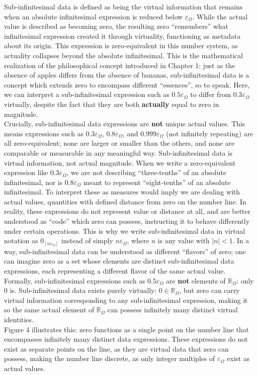\documentclass{article}
\begin{document}
Sub-infinitesimal data is defined as being the virtual information that remains when an absolute infinitesimal expression is reduced below $\varepsilon_\Omega$. While the actual value is described as becoming zero, the resulting zero ``remembers'' what infinitesimal expression created it through virtuality, functioning as metadata about its origin. This expression is zero-equivalent in this number system, as actuality collapses beyond the absolute infinitesimal. This is the mathematical realization of the philosophical concept introduced in Chapter 1: just as the absence of apples differs from the absence of bananas, sub-infinitesimal data is a concept which extends zero to encompass different ``essences'', so to speak. Here, we can interpret a sub-infinitesimal expression such as $0.5\varepsilon_\Omega$ to differ from $0.3\varepsilon_\Omega$ virtually, despite the fact that they are both \textbf{actually} equal to zero in magnitude.
\\Crucially, sub-infinitesimal data expressions are \textbf{not} unique actual values. This means expressions such as $0.3\varepsilon_\Omega$, $0.8\varepsilon_\Omega$, and $0.999\varepsilon_\Omega$ (not infinitely repeating) are all zero-equivalent; none are larger or smaller than the others, and none are comparable or measurable in any meaningful way. Sub-infinitesimal data is virtual information, not actual magnitude. When we write a zero-equivalent expression like $0.3\varepsilon_\Omega$, we are not describing ``three-tenths'' of an absolute infinitesimal, nor is $0.8\varepsilon_\Omega$ meant to represent ``eight-tenths'' of an absolute infinitesimal. To interpret these as measures would imply we are dealing with actual values, quantities with defined distance from zero on the number line. In reality, these expressions do not represent value or distance at all, and are better understood as ``code'' which zero can possess, instructing it to behave differently under certain operations.  This is why we write sub-infinitesimal data in virtual notation as $0_{[n\varepsilon_\Omega]}$ instead of simply $n\varepsilon_\Omega$, where $n$ is any value with $|n| < 1$. 
In a way, sub-infinitesimal data can be understood as different ``flavors'' of zero; one can imagine zero as a set whose elements are distinct sub-infinitesimal data expressions, each representing a different flavor of the same actual value. Formally, sub-infinitesimal expressions such as $0.5\varepsilon_\Omega$ are \textbf{not} elements of $\mathbb{R}_\Omega$: only $0$ is. Sub-infinitesimal data exists purely virtually: $0 \in \mathbb{R}_\Omega$, but zero can carry virtual information corresponding to any sub-infinitesimal expression, making it so the same actual element of $\mathbb{R}_\Omega$ can possess infinitely many distinct virtual identities. 
\\Figure 4 illustrates this: zero functions as a single point on the number line that encompasses infinitely many distinct data expressions. These expressions do not exist as separate points on the line, as they are virtual data that zero can possess, making the number line discrete, as only integer multiples of $\varepsilon_\Omega$ exist as actual values.
\end{document}
